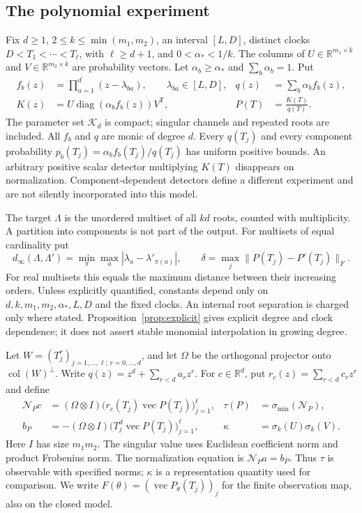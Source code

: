 \documentclass[11pt,reqno]{amsart}
\numberwithin{equation}{section}
\theoremstyle{definition}\newtheorem{definition}[theorem]{Definition}
\theoremstyle{remark}\newtheorem{remark}[theorem]{Remark}
\newcommand{\R}{\mathbb R}
\newcommand{\diag}{\operatorname{diag}}
\newcommand{\cK}{\mathcal K}
\newcommand{\cN}{\mathcal N}
\begin{document}
\subsection{The polynomial experiment}
Fix $d\ge1$, $2\le k\le\min(m_1,m_2)$, an interval $[L,D]$, distinct
clocks $D<T_1<\cdots<T_\ell$, with $\ell\ge d+1$, and
$0<\alpha_*<1/k$. The columns of
$U\in\R^{m_1\times k}$ and $V\in\R^{m_2\times k}$ are probability
vectors. Let $\alpha_b\ge\alpha_*$ and $\sum_b\alpha_b=1$. Put
\begin{align}
 f_b(z)&=\prod_{a=1}^d(z-\lambda_{ba}),\qquad \lambda_{ba}\in[L,D],
       &q(z)&=\sum_b\alpha_b f_b(z),\nonumber\\
 K(z)&=U\diag(\alpha_b f_b(z))V^{\mathsf T},
       &P(T)&=\frac{K(T)}{q(T)}.                  \label{eq:model}
\end{align}
The parameter set $\cK_d$ is compact; singular channels and repeated
roots are included. All $f_b$ and $q$ are monic of degree $d$.
Every $q(T_j)$ and every component probability
$p_b(T_j)=\alpha_b f_b(T_j)/q(T_j)$ has uniform positive bounds.
An arbitrary positive scalar detector multiplying $K(T)$ disappears
on normalization. Component-dependent detectors define a different
experiment and are not silently incorporated into this model.

The target $\Lambda$ is the unordered multiset of all $kd$ roots,
counted with multiplicity. A partition into components is not part
of the output. For multisets of equal cardinality put
\[
 d_\infty(\Lambda,\Lambda')=\min_\pi\max_a|\lambda_a-\lambda'_{\pi(a)}|,
 \qquad \delta=\max_j\|P(T_j)-P'(T_j)\|_F.
\]
For real multisets this equals the maximum distance between their
increasing orders. Unless explicitly quantified, constants depend only
on $d,k,m_1,m_2,\alpha_*,L,D$ and the fixed clocks. An internal root
separation is charged only where stated. Proposition~\ref{prop:explicit}
gives explicit degree and clock dependence; it does not assert stable
monomial interpolation in growing degree.

Let $W=(T_j^r)_{j=1,\ldots,\ell;\,r=0,\ldots,d}$, and let $\Omega$
be the orthogonal projector onto $\operatorname{col}(W)^\perp$. Write
$q(z)=z^d+\sum_{r<d}a_rz^r$. For $c\in\R^d$, put
$r_c(z)=\sum_{r<d}c_rz^r$ and define
\begin{align}
 \cN_Pc&=(\Omega\otimes I)
       \big(r_c(T_j)\operatorname{vec}P(T_j)\big)_{j=1}^{\ell},
       &\tau(P)&=\sigma_{\min}(\cN_P),\nonumber\\
 b_P&=-(\Omega\otimes I)
       \big(T_j^d\operatorname{vec}P(T_j)\big)_{j=1}^{\ell},
       &\kappa&=\sigma_k(U)\sigma_k(V).           \label{eq:normalization}
\end{align}
Here $I$ has size $m_1m_2$. The singular value uses Euclidean
coefficient norm and product Frobenius norm. The normalization equation
is $\cN_Pa=b_P$. Thus $\tau$ is observable with specified norms;
$\kappa$ is a representation quantity used for comparison.
We write $F(\theta)=(\operatorname{vec}P_\theta(T_j))_j$ for the
finite observation map, also on the closed model.
\end{document}
